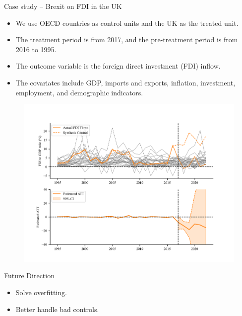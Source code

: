 \documentclass{beamer}
\begin{document}
\begin{frame}{Case study -- Brexit on FDI in the UK}
\footnotesize
\begin{itemize}
    \item We use OECD countries as control units and the UK as the treated unit.
    \item The treatment period is from 2017, and the pre-treatment period is from 2016 to 1995.
    \item The outcome variable is the foreign direct investment (FDI) inflow.
    \item The covariates include GDP, imports and exports, inflation, investment, employment, and demographic indicators.
\end{itemize}
\begin{figure}
    \centering
    \includegraphics[scale=0.5]{figs/ukfdi_ipca.png}
\end{figure}
\end{frame}

\begin{frame}{Future Direction}
    \begin{itemize}
        \item Solve overfitting.
        \item Better handle bad controls.
    \end{itemize}
    
\end{frame}
\end{document}
